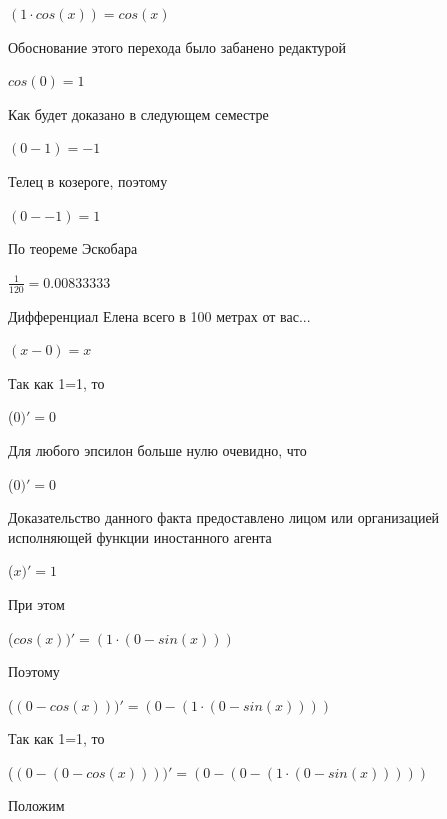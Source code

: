 \documentclass[12pt,a4paper,fleqn]{article}
\begin{document}
\begin{center}
\begin{center}
\begin{center}
\begin{center}
\begin{center}
\begin{center}
\begin{center}
\begin{center}
\begin{center}
\begin{center}
\begin{center}
\begin{center}
\begin{center}
\begin{center}
$(1 \cdot cos(x)) = cos(x)$\end{center}
Обоснование этого перехода было забанено редактурой

\begin{center}
\begin{center}$cos(0) = 1$\end{center}
Как будет доказано в следующем семестре

\begin{center}
\begin{center}$(0-1) = -1$\end{center}
Телец в козероге, поэтому

\begin{center}
\begin{center}$(0--1) = 1$\end{center}
По теореме Эскобара

\begin{center}
\begin{center}$\frac{1}{120} = 0.00833333$\end{center}
Дифференциал Елена всего в 100 метрах от вас...

\begin{center}
$(x-0) = x$\end{center}
Так как 1=1, то\cite{link4}

\begin{center}
 ($0)'
  = 0$\end{center}
Для любого эпсилон больше нулю очевидно, что

\begin{center}
 ($0)'
  = 0$\end{center}
Доказательство данного факта предоставлено лицом или организацией исполняющей функции иностанного агента

\begin{center}
 ($x)'
  = 1$\end{center}
При этом

\begin{center}
 ($cos(x))'
  = (1 \cdot (0-sin(x)))$\end{center}
Поэтому

\begin{center}
 ($(0-cos(x)))'
  = (0-(1 \cdot (0-sin(x))))$\end{center}
Так как 1=1, то\cite{link4}

\begin{center}
 ($(0-(0-cos(x))))'
  = (0-(0-(1 \cdot (0-sin(x)))))$\end{center}
Положим


\end{center}
\end{center}
\end{center}
\end{center}
\end{center}
\end{center}
\end{center}
\end{center}
\end{center}
\end{center}
\end{center}
\end{center}
\end{center}
\end{center}
\end{center}
\end{center}
\end{center}
\end{document}
